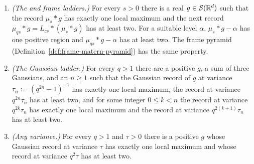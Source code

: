 \begin{proposition}
\begin{enumerate}
$\widehat\eta > 0$ and $1/\widehat\eta(\omega) \le C_\varepsilon e^{\varepsilon|\omega|^2}$ for every
$\varepsilon > 0$, with constants $C_\varepsilon$. Then every $f_{a,\delta}$ is $\eta * g$ with $g$
real, bounded, continuous and in $L^2$.
\item \emph{(The \Matern{} and frame \Matern{} ladders.)} For every $s > 0$ there is a real
$g \in \mathcal{S}(\mathbb{R}^d)$ such that the record $\mu_s * g$ has exactly one local maximum and the
next record $\mu_{qs} * g = L_{cs} * (\mu_s * g)$ has at least two. For a suitable level $\alpha$,
$\mu_s * g - \alpha$ has one positive region and $\mu_{qs} * g - \alpha$ has at least two. The frame
\Matern{} pyramid (Definition~\ref{def:frame-matern-pyramid}) has the same property.
\item \emph{(The Gaussian ladder.)} For every $q > 1$ there are a positive $g$, a sum of three
Gaussians, and an $n \ge 1$ such that the Gaussian record of $g$ at variance
$\tau_n := (q^{2n} - 1)^{-1}$ has exactly one local maximum, the record at variance
$q^{2n}\tau_n$ has at least two, and
for some integer $0 \le k < n$ the record at variance $q^{2k}\tau_n$ has exactly one local maximum
and the record at variance $q^{2(k+1)}\tau_n$ has at least two.
\item \emph{(Any variance.)} For every $q > 1$ and $\tau > 0$ there is a positive $g$ whose
Gaussian record at variance $\tau$ has exactly one local maximum and whose record at variance
$q^2\tau$ has at least two.
\end{enumerate}

\end{proposition}
